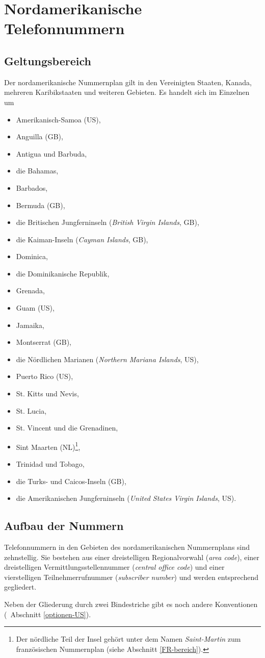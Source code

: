 \documentclass[numbers=noenddot]{scrreprt}
\newcommand\Abschnittsliteratur[1]{\bgroup
\small
\raggedright
\printbibliography[heading=subbibnumbered,keyword=#1]
\egroup}
\newcommand\UeberschriftGeltungsbereich{\section{Geltungsbereich}}
\newcommand\UeberschriftAufbau{\section{Aufbau der Nummern}}
\newcommand*\vglAbschnitt[1]{(\cf\ Abschnitt \ref{#1})}
\newcommand*\sieheAbschnitt[1]{(siehe Abschnitt \ref{#1})}
\begin{document}
\Abschnittsliteratur{british}

\chapter{Nordamerikanische Telefonnummern} \label{US}
\UeberschriftGeltungsbereich \label{US-bereich}
Der nordamerikanische Nummernplan
\cite{wikipedia-NANP}
gilt in den Vereinigten Staaten, Kanada, mehreren Karibikstaaten und weiteren Gebieten. Es handelt sich im Einzelnen um
\begin{itemize}
\item Amerikanisch-Samoa (US),
\item Anguilla (GB),
\item Antigua und Barbuda,
\item die Bahamas,
\item Barbados,
\item Bermuda (GB),
\item die Britischen Jungferninseln (\emph{British Virgin Islands}, GB),
\item die Kaiman-Inseln (\emph{Cayman Islands}, GB),
\item Dominica,
\item die Dominikanische Republik,
\item Grenada,
\item Guam (US),
\item Jamaika,
\item Montserrat (GB),
\item die Nördlichen Marianen (\emph{Northern Mariana Islands}, US),
\item Puerto Rico (US),
\item St. Kitts und Nevis,
\item St. Lucia,
\item St. Vincent und die Grenadinen,
\item Sint Maarten (NL)\footnote{Der nördliche Teil der Insel gehört unter dem Namen \emph{Saint-Martin} zum französischen Nummernplan
\sieheAbschnitt{FR-bereich}.},
\item Trinidad und Tobago,
\item die Turks- und Caicos-Inseln (GB),
\item die Amerikanischen Jungferninseln (\emph{United States Virgin Islands}, US).
\end{itemize}

\UeberschriftAufbau
Telefonnummern in den Gebieten des nordamerikanischen Nummernplans sind zehnstellig. Sie bestehen aus einer dreistelligen Regionalvorwahl (\emph{area code}), einer dreistelligen Vermittlungsstellennummer (\emph{central office code}) und einer vierstelligen Teilnehmerrufnummer (\emph{subscriber number}) und werden entsprechend gegliedert.
\begin{sidebyside}
\end{sidebyside}
Neben der Gliederung durch zwei Bindestriche gibt es noch andere Konventionen
\vglAbschnitt{optionen-US}.
\end{document}
